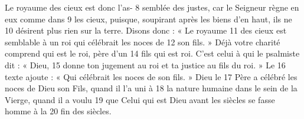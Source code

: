Le royaume des cieux est donc l'as-	 
8	 	semblée des justes, car le Seigneur règne en eux comme dans	 
9	 	les cieux, puisque, soupirant après les biens d'en haut, ils ne	 
10	 	désirent plus rien sur la terre. Disons donc : « Le royaume	 
11	 	des cieux est semblable à un roi qui célébrait les noces de	 
12	 	son fils. »
Déjà votre charité comprend qui est le roi, père d'un	 
14	 	fils qui est roi. C'est celui à qui le psalmiste dit : « Dieu,	 
15	 	donne ton jugement au roi et ta justice au fils du roi. » Le	 
16	 	texte ajoute : « Qui célébrait les noces de son fils. » Dieu le	 
17	 	Père a célébré les noces de Dieu son Fils, quand il l'a uni à	 
18	 	la nature humaine dans le sein de la Vierge, quand il a voulu	 
19	 	que Celui qui est Dieu avant les siècles se fasse homme à la	 
20	 	fin des siècles.